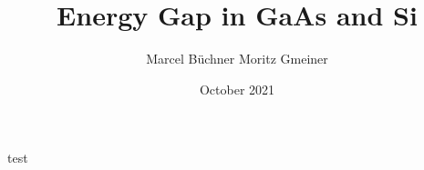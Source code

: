 \documentclass[10pt,abstract=true,titlepage=false,toc=bib]{scrartcl}
\title{Energy Gap in GaAs and Si}
\author{Marcel Büchner \hspace{80pt} Moritz Gmeiner}
\date{October 2021}
\begin{document}
test
\end{document}
